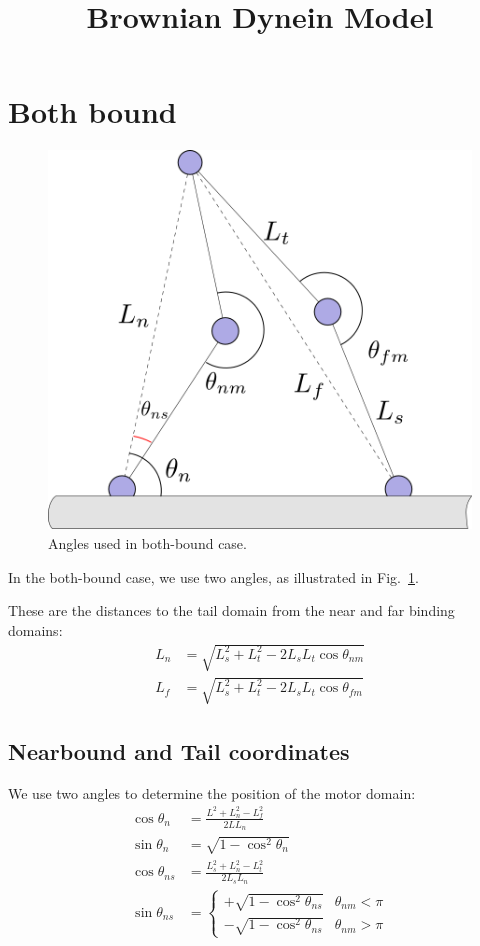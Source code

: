 \documentclass[11pt,twocolumn]{article}
\title{Brownian Dynein Model}
\begin{document}
\maketitle

\section{Both bound}

\begin{figure}
  \includegraphics[width=\columnwidth]{../figures/code-bothbound.png}
  \caption{Angles used in both-bound case.}\label{fig:bothbound}
\end{figure}

In the both-bound case, we use two angles, as illustrated in
Fig.~\ref{fig:bothbound}.

These are the distances to the tail domain from the near and far
binding domains:
\begin{align}
  L_n &= \sqrt{L_s^2 + L_t^2 - 2L_sL_t\cos{\theta_{nm}}} \\
  L_f &= \sqrt{L_s^2 + L_t^2 - 2L_sL_t\cos{\theta_{fm}}}
\end{align}

\subsection{Nearbound and Tail coordinates}

We use two angles to determine the position of the motor domain:
\begin{align}
  \cos\theta_n &= \frac{L^2 + L_n^2 - L_f^2}{2L L_n} \\
  \sin\theta_{n} &= \sqrt{1 - \cos^2\theta_{n}} \\
  \cos\theta_{ns} &= \frac{L_s^2 + L_n^2 - L_t^2}{2L_s L_n} \\
  \sin\theta_{ns} &=
  \begin{cases}
    +\sqrt{1 - \cos^2\theta_{ns}} & \theta_{nm} < \pi \\
    -\sqrt{1 - \cos^2\theta_{ns}} & \theta_{nm} > \pi
  \end{cases}
\end{align}
\end{document}
